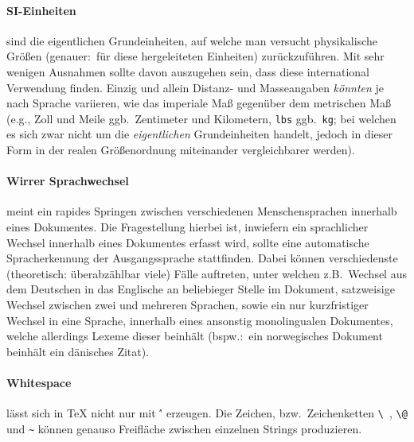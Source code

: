 \paragraph*{SI-Einheiten}\label{par:siunits}sind die eigentlichen Grundeinheiten, auf welche man versucht physikalische Größen (genauer:\ für diese hergeleiteten Einheiten) zurückzuführen. Mit sehr wenigen Ausnahmen sollte davon auszugehen sein, dass diese international Verwendung finden. Einzig und allein %
Distanz- und Masseangaben \textit{könnten} je nach Sprache variieren, wie das imperiale Maß gegenüber dem metrischen Maß (e.g., Zoll und Meile ggb.\ Zentimeter und Kilometern, \texttt{lbs} ggb.\ \texttt{kg}; bei welchen es sich zwar nicht um die \textit{eigentlichen} Grundeinheiten handelt, jedoch in dieser Form in der realen Größenordnung miteinander vergleichbarer werden).%

\paragraph*{Wirrer Sprachwechsel} meint ein rapides Springen zwischen verschiedenen Menschensprachen innerhalb eines Dokumentes. Die Fragestellung hierbei ist, inwiefern ein sprachlicher Wechsel innerhalb eines Dokumentes erfasst wird, sollte eine automatische Spracherkennung der Ausgangssprache stattfinden. Dabei können verschiedenste (theoretisch: überabzählbar viele) Fälle auftreten, unter welchen z.B.\ Wechsel aus dem Deutschen in das Englische an beliebieger Stelle im Dokument, satzweisige Wechsel zwischen zwei und mehreren Sprachen, sowie ein nur kurzfristiger Wechsel in eine Sprache, innerhalb eines ansonstig monolingualen Dokumentes, welche allerdings Lexeme dieser beinhält (bspw.:\ ein norwegisches Dokument beinhält ein dänisches Zitat).

\paragraph*{Whitespace} lässt sich in \TeX{} nicht nur mit \' ' erzeugen. Die Zeichen, bzw.\ Zeichenketten \verb|\ |, \verb|\@| und \verb|~| können genauso Freifläche zwischen einzelnen Strings produzieren.
